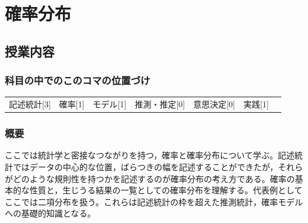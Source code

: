 \section{確率分布}
\label{D1_lesson07}

\subsection{授業内容}
\subsubsection{科目の中でのこのコマの位置づけ}
\begin{tabular}[t]{ccccccc}
    記述統計[3] & 確率[1] & モデル[1] & 推測・推定[0] & 意思決定[0] & 実践[1]
\end{tabular}
\subsubsection{概要}
ここでは統計学と密接なつながりを持つ，確率と確率分布について学ぶ。記述統計ではデータの中心的な位置，ばらつきの幅を記述することができたが，それらがどのような規則性を持つかを記述するのが確率分布の考え方である。確率の基本的な性質と，生じうる結果の一覧としての確率分布を理解する。代表例としてここでは二項分布を扱う。これらは記述統計の枠を超えた推測統計，確率モデルへの基礎的知識となる。
